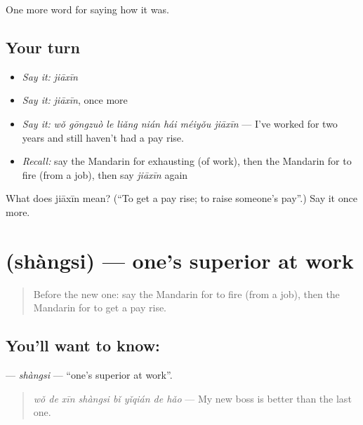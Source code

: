 \begin{grammarlens}[title={What you've built}]
One more word for saying how it was.
\end{grammarlens}

\subsection*{Your turn}
\begin{itemize}
\raggedright
  \item \emph{Say it:} \emph{jiāxīn}
  \item \emph{Say it:} \emph{jiāxīn}, once more
  \item \emph{Say it:} \emph{wǒ gōngzuò le liǎng nián hái méiyǒu jiāxīn} — I've worked for two years and still haven't had a pay rise.
  \item \emph{Recall:} say the Mandarin for exhausting (of work), then the Mandarin for to fire (from a job), then say \emph{jiāxīn} again
\end{itemize}

\begin{tcolorbox}[breakable,colback=teal!4,colframe=teal!35!black,title={Before you move on}]
What does jiāxīn mean? (\textquotedblleft{}To get a pay rise; to raise someone's pay\textquotedblright{}.) Say it once more.
\end{tcolorbox}
\section[\texorpdfstring{\zh{上司} (shàngsi)}{上司 (shàngsi)}]{ (shàngsi) — one's superior at work}

\label{lesson:ZH-C491-shangsi}



\begin{quote}
Before the new one: say the Mandarin for to fire (from a job), then the Mandarin for to get a pay rise.
\end{quote}

\subsection*{You'll want to know: }
\textbf{} — \emph{shàngsi} — \textquotedblleft{}one's superior at work\textquotedblright{}.

\begin{quote}
\textbf{} \emph{wǒ de xīn shàngsi bǐ yǐqián de hǎo} — My new boss is better than the last one.
\end{quote}

